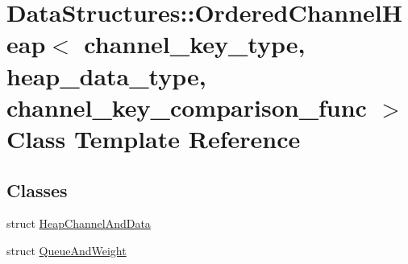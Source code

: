 \hypertarget{class_data_structures_1_1_ordered_channel_heap}{\section{Data\-Structures\-:\-:Ordered\-Channel\-Heap$<$ channel\-\_\-key\-\_\-type, heap\-\_\-data\-\_\-type, channel\-\_\-key\-\_\-comparison\-\_\-func $>$ Class Template Reference}
\label{class_data_structures_1_1_ordered_channel_heap}
}
\subsection*{Classes}
\begin{DoxyCompactItemize}
\item 
struct \hyperlink{struct_data_structures_1_1_ordered_channel_heap_1_1_heap_channel_and_data}{Heap\-Channel\-And\-Data}
\item 
struct \hyperlink{struct_data_structures_1_1_ordered_channel_heap_1_1_queue_and_weight}{Queue\-And\-Weight}
\end{DoxyCompactItemize}
